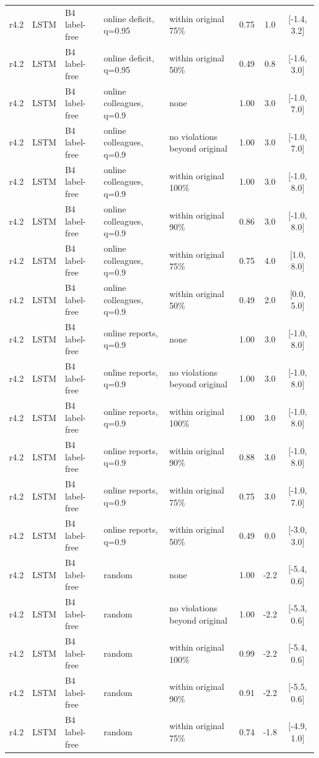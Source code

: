 \begin{longtable}{lllp{4.2cm}p{3.4cm}ccc}
r4.2 & LSTM & B4 label-free & online deficit, q=0.95 & within original 75\% & 0.75 & 1.0 & [-1.4, 3.2] \\
r4.2 & LSTM & B4 label-free & online deficit, q=0.95 & within original 50\% & 0.49 & 0.8 & [-1.6, 3.0] \\
r4.2 & LSTM & B4 label-free & online colleagues, q=0.9 & none & 1.00 & 3.0 & [-1.0, 7.0] \\
r4.2 & LSTM & B4 label-free & online colleagues, q=0.9 & no violations beyond original & 1.00 & 3.0 & [-1.0, 7.0] \\
r4.2 & LSTM & B4 label-free & online colleagues, q=0.9 & within original 100\% & 1.00 & 3.0 & [-1.0, 8.0] \\
r4.2 & LSTM & B4 label-free & online colleagues, q=0.9 & within original 90\% & 0.86 & 3.0 & [-1.0, 8.0] \\
r4.2 & LSTM & B4 label-free & online colleagues, q=0.9 & within original 75\% & 0.75 & 4.0 & [1.0, 8.0] \\
r4.2 & LSTM & B4 label-free & online colleagues, q=0.9 & within original 50\% & 0.49 & 2.0 & [0.0, 5.0] \\
r4.2 & LSTM & B4 label-free & online reports, q=0.9 & none & 1.00 & 3.0 & [-1.0, 8.0] \\
r4.2 & LSTM & B4 label-free & online reports, q=0.9 & no violations beyond original & 1.00 & 3.0 & [-1.0, 8.0] \\
r4.2 & LSTM & B4 label-free & online reports, q=0.9 & within original 100\% & 1.00 & 3.0 & [-1.0, 8.0] \\
r4.2 & LSTM & B4 label-free & online reports, q=0.9 & within original 90\% & 0.88 & 3.0 & [-1.0, 8.0] \\
r4.2 & LSTM & B4 label-free & online reports, q=0.9 & within original 75\% & 0.75 & 3.0 & [-1.0, 7.0] \\
r4.2 & LSTM & B4 label-free & online reports, q=0.9 & within original 50\% & 0.49 & 0.0 & [-3.0, 3.0] \\
r4.2 & LSTM & B4 label-free & random & none & 1.00 & -2.2 & [-5.4, 0.6] \\
r4.2 & LSTM & B4 label-free & random & no violations beyond original & 1.00 & -2.2 & [-5.3, 0.6] \\
r4.2 & LSTM & B4 label-free & random & within original 100\% & 0.99 & -2.2 & [-5.4, 0.6] \\
r4.2 & LSTM & B4 label-free & random & within original 90\% & 0.91 & -2.2 & [-5.5, 0.6] \\
r4.2 & LSTM & B4 label-free & random & within original 75\% & 0.74 & -1.8 & [-4.9, 1.0] \\

\end{longtable}

